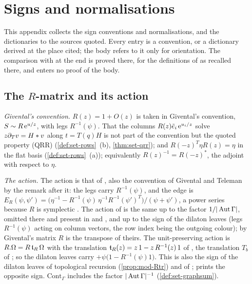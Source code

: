\section{Signs and normalisations}
\label{sec:sgn}

This appendix collects the sign conventions and normalisations, and the dictionaries to the sources quoted. Every entry is a convention, or a dictionary derived at the place cited; the body refers to it only for orientation. The comparison with \cite{CGYZ26} at the end is proved there, for the definitions of \cite{CGYZ26} as recalled there, and enters no proof of the body.

\subsection{The \texorpdfstring{$R$}{R}-matrix and its action}
\label{sec:sgn-R}

\emph{Givental's convention.} $R(z)=1+O(z)$ is taken in Givental's convention, $S\sim R\,\mathrm{e}^{u/z}$, with legs $R^{-1}(\psi)$. That the columns $R(z)\tilde e_i\,\mathrm{e}^{u_i/z}$ solve $z\partial_Tv=H*v$ along $t=T(q)H$ is not part of the convention but the quoted property (QRR) (\cref{def:set-rows}~(b), \cref{thm:set-qrr}); and $R(-z)^T\eta R(z)=\eta$ in the flat basis (\cref{def:set-rows}~(a)); equivalently $R(z)^{-1}=R(-z)^*$, the adjoint with respect to $\eta$.

\emph{The action.} The action is that of \cite[Def.~2.2]{PPZ15}, also the convention of Givental and Teleman by the remark after it: the legs carry $R^{-1}(\psi)$, and the edge is $E_R(\psi,\psi')=\bigl(\eta^{-1}-R^{-1}(\psi)\,\eta^{-1}R^{-1}(\psi')^T\bigr)/(\psi+\psi')$, a power series because $R$ is symplectic \cite[Remark~2.1, (6)]{PPZ15}. The action of \cite[\S2.3]{Dunin-Barkowski:2015caa} is the same up to the factor $1/|\operatorname{Aut}\Gamma|$, omitted there and present in \cite[(2-26)]{DuninBarkowski:2012bw} and \cite[Def.~2.2]{PPZ15}, and up to the sign of the dilaton leaves (legs $R^{-1}(\psi)$ acting on column vectors, the row index being the outgoing colour); by \cite[Remark~2.1]{Dunin-Barkowski:2015caa} Givental's matrix $R$ is the transpose of theirs. The unit-preserving action is $R.\Omega=R\,\mathfrak{t}_R\,\Omega$ with the translation $\mathfrak{t}_R(z)=z\,1-z\,R^{-1}(z)\,1$ of \cite[Def.~2.13]{PPZ15}, the translation $T_b$ of \cite[Prop.~2.12]{PPZ15}; so the dilaton leaves carry $+\psi\bigl(1-R^{-1}(\psi)1\bigr)$. This is also the sign of the dilaton leaves of topological recursion (\cref{prop:mod-Rtr}) and of \cite[\S2.3]{DuninBarkowski:2012bw}; \cite[\S2.3]{Dunin-Barkowski:2015caa} prints the opposite sign. $\mathrm{Cont}_\Gamma$ includes the factor $|\operatorname{Aut}\Gamma|^{-1}$ (\cref{def:set-graphsum}).

